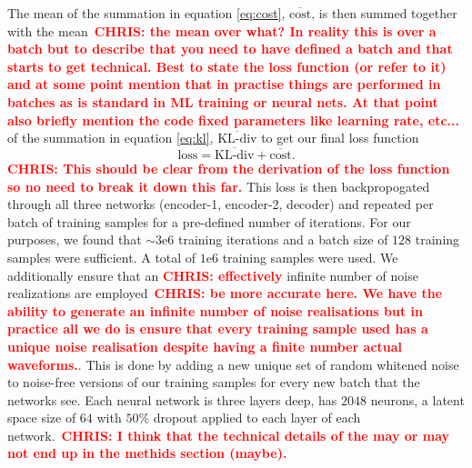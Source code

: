 \documentclass[%
showpacs,
 amsmath,amssymb,
 aps,
 twocolumn,
 prl,
 reprint,
floatfix,
]{revtex4-1}
\newcommand{\chris}[1]{\textbf{\textcolor{red}{CHRIS: #1}}}
\begin{document}
The mean of the summation in equation \ref{eq:cost},
$\overline{\textrm{cost}}$, is then summed together with the mean~\chris{the
mean over what? In reality this is over a batch but to describe that you need
to have defined a batch and that starts to get technical. Best to state the
loss function (or refer to it) and at some point mention that in practise
things are performed in batches as is standard in ML training or neural nets.
At that point also briefly mention the code fixed parameters like learning
rate, etc...} of the summation in equation \ref{eq:kl},
$\overline{\textrm{KL-div}}$ to get our final loss function
%
\begin{equation} 
\textrm{loss} = \overline{\textrm{KL-div}} + \overline{\textrm{cost}}.  
\end{equation}
%
\chris{This should be clear from the derivation of the loss function so no need
to break it down this far.} This loss is then backpropogated through all three
networks (encoder-1, encoder-2, decoder) and repeated per batch of training
samples for a pre-defined number of iterations. For our purposes, we found that
$\sim3\textrm{e}6$ training iterations and a batch size of $128$ training
samples were sufficient. A total of $1\textrm{e}6$ training samples were used.
We additionally ensure that an \chris{effectively} infinite number of noise
realizations are employed~\chris{be more accurate here. We have the ability to
generate an infinite number of noise realisations but in practice all we do is
ensure that every training sample used has a unique noise realisation despite
having a finite number actual waveforms.}. This is done by adding a new unique
set of random whitened noise to noise-free versions of our training samples for
every new batch that the networks see. Each neural network is three layers
deep, has $2048$ neurons, a latent space size of $64$ with $50\%$ dropout
applied to each layer of each network.~\chris{I think that the technical
details of the may or may not end up in the methids section (maybe).}
\end{document}
